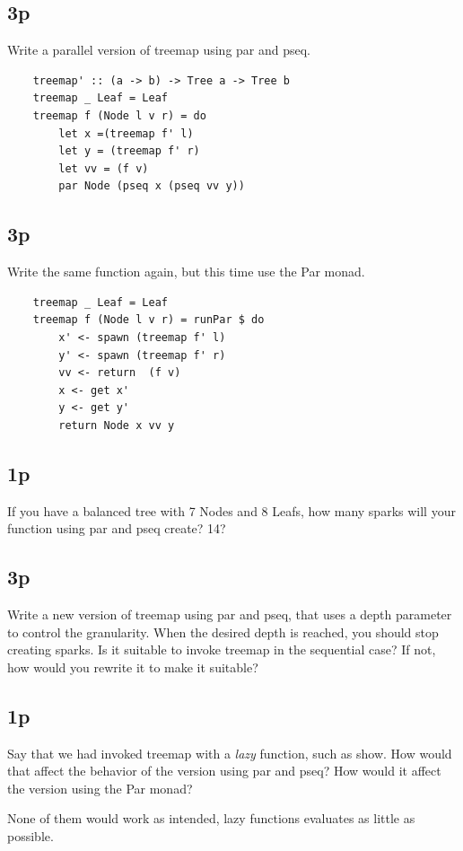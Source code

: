 \subsection{3p}
Write a parallel version of treemap using par and pseq.

\begin{lstlisting}
	treemap' :: (a -> b) -> Tree a -> Tree b
	treemap _ Leaf = Leaf
	treemap f (Node l v r) = do
		let x =(treemap f' l)
		let y = (treemap f' r)
		let vv = (f v)
		par Node (pseq x (pseq vv y))
\end{lstlisting}

\subsection{3p}
Write the same function again, but this time use the Par monad.

\begin{lstlisting}
	treemap _ Leaf = Leaf
	treemap f (Node l v r) = runPar $ do
		x' <- spawn (treemap f' l)
		y' <- spawn (treemap f' r)
		vv <- return  (f v)
		x <- get x'
		y <- get y'
		return Node x vv y
\end{lstlisting}

\subsection{1p}
If you have a balanced tree with 7 Nodes and 8 Leafs, how many sparks will your function using par and pseq create?
14?

\subsection{3p}
Write a new version of treemap using par and pseq, that uses a depth parameter to control the granularity. When the desired depth is reached, you should stop creating sparks. Is it suitable to invoke treemap in the sequential case? If not, how would you rewrite it to make it suitable?

\subsection{1p}
Say that we had invoked treemap with a \textit{lazy} function, such as show. How would that affect the behavior of the version using par and pseq? How would it affect the version using the Par monad?

None of them would work as intended, lazy functions evaluates as little as possible.

